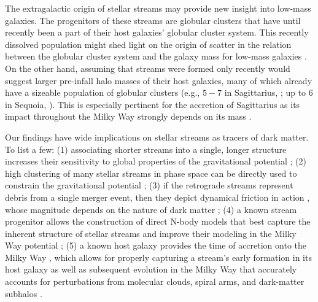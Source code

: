 \documentclass[twocolumn]{aastex63}
\begin{document}
The extragalactic origin of stellar streams may provide new insight into low-mass galaxies.
The progenitors of these streams are globular clusters that have until recently been a part of their host galaxies' globular cluster system.
This recently dissolved population might shed light on the origin of scatter in the relation between the globular cluster system and the galaxy mass for low-mass galaxies \citep[e.g.,][]{harris2013}.
On the other hand, assuming that streams were formed only recently would suggest larger pre-infall halo masses of their host galaxies, many of which already have a sizeable population of globular clusters (e.g., $5-7$ in Sagittarius, \citealt{Johnson2020}; up to 6 in Sequoia, \citealt{myeong2019}).
This is especially pertinent for the accretion of Sagittarius as its impact throughout the Milky Way strongly depends on its mass \citep{laporte2019}.

Our findings have wide implications on stellar streams as tracers of dark matter.
To list a few:
(1) associating shorter streams into a single, longer structure increases their sensitivity to global properties of the gravitational potential \citep{bh2018};
(2) high clustering of many stellar streams in phase space can be directly used to constrain the gravitational potential \citep{sanderson2015, reino2020};
(3) if the retrograde streams represent debris from a single merger event, then they depict dynamical friction in action \citep[e.g.,][]{chandrasekhar1942, white1978}, whose magnitude depends on the nature of dark matter \citep[e.g.,][]{lancaster2020};
(4) a known stream progenitor allows the construction of direct N-body models that best capture the inherent structure of stellar streams \citep[e.g.,][]{kuepper2008, just2009} and improve their modeling in the Milky Way potential \citep{kuepper2015};
(5) a known host galaxy provides the time of accretion onto the Milky Way \citep[e.g.,][]{kruijssen2020}, which allows for properly capturing a stream's early formation in its host galaxy \citep[e.g.,][]{carlberg2018, malhan2020} as well as subsequent evolution in the Milky Way that accurately accounts for perturbations from molecular clouds, spiral arms, and dark-matter subhalos \citep[e.g.,][]{erkal2016, banik2019}.
\end{document}

